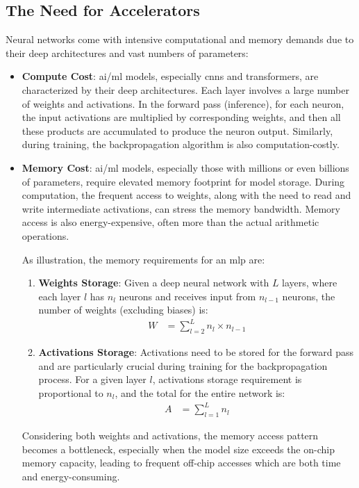 \subsection{The Need for Accelerators}
Neural networks come with intensive computational and memory demands due to their deep architectures and vast numbers of parameters:

\begin{itemize}
	\item \textbf{Compute Cost}: \gls{ai}/\gls{ml} models, especially \glspl{cnn} and transformers, are characterized by their deep architectures. Each layer involves a large number of weights and activations. In the forward pass (inference), for each neuron, the input activations are multiplied by corresponding weights, and then all these products are accumulated to produce the neuron output. Similarly, during training, the backpropagation algorithm is also computation-costly.
	
	\item \textbf{Memory Cost}: \gls{ai}/\gls{ml} models, especially those with millions or even billions of parameters, require elevated memory footprint for model storage. During computation, the frequent access to weights, along with the need to read and write intermediate activations, can stress the memory bandwidth. Memory access is also energy-expensive, often more than the actual arithmetic operations.
	
	As illustration, the memory requirements for an \gls{mlp} are:
	\begin{enumerate}
		\item \textbf{Weights Storage}: Given a deep neural network with \(L\) layers, where each layer \(l\) has \(n_l\) neurons and receives input from \(n_{l-1}\) neurons, the number of weights (excluding biases) is:
		\begin{align*}
		W &= \sum_{l=2}^{L} n_l \times n_{l-1}
		\end{align*}
		
		\item \textbf{Activations Storage}: Activations need to be stored for the forward pass and are particularly crucial during training for the backpropagation process. For a given layer \(l\), activations storage requirement is proportional to \(n_l\), and the total for the entire network is:
		\begin{align*}
		A &= \sum_{l=1}^{L} n_l
		\end{align*}
	\end{enumerate}
	Considering both weights and activations, the memory access pattern becomes a bottleneck, especially when the model size exceeds the on-chip memory capacity, leading to frequent off-chip accesses which are both time and energy-consuming.
	

\end{itemize}
